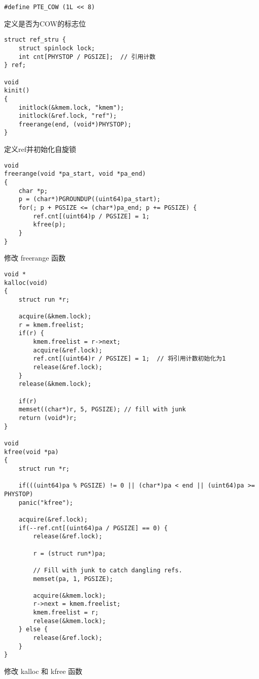 \begin{listing}[!htb]
	\begin{verbatim}
#define PTE_COW (1L << 8)
	\end{verbatim}
	\caption{定义是否为COW的标志位}\label{lst:define_PTE_COW}
\end{listing}

\begin{listing}[!htb]
	\begin{verbatim}
struct ref_stru {
    struct spinlock lock;
    int cnt[PHYSTOP / PGSIZE];  // 引用计数
} ref;

void
kinit()
{
    initlock(&kmem.lock, "kmem");
    initlock(&ref.lock, "ref");
    freerange(end, (void*)PHYSTOP);
}
	\end{verbatim}
	\caption{定义ref并初始化自旋锁}\label{lst:define_ref_and_init_self_lock}
\end{listing}

\begin{listing}[!htb]
	\begin{verbatim}
void
freerange(void *pa_start, void *pa_end)
{
    char *p;
    p = (char*)PGROUNDUP((uint64)pa_start);
    for(; p + PGSIZE <= (char*)pa_end; p += PGSIZE) {
        ref.cnt[(uint64)p / PGSIZE] = 1;
        kfree(p);
    }
}
	\end{verbatim}
	\caption{修改 freerange 函数}\label{lst:change_freerange}
\end{listing}

\begin{listing}[!htb]
	\begin{verbatim}
void *
kalloc(void)
{
    struct run *r;
    
    acquire(&kmem.lock);
    r = kmem.freelist;
    if(r) {
        kmem.freelist = r->next;
        acquire(&ref.lock);
        ref.cnt[(uint64)r / PGSIZE] = 1;  // 将引用计数初始化为1
        release(&ref.lock);
    }
    release(&kmem.lock);
    
    if(r)
    memset((char*)r, 5, PGSIZE); // fill with junk
    return (void*)r;
}

void
kfree(void *pa)
{
    struct run *r;
    
    if(((uint64)pa % PGSIZE) != 0 || (char*)pa < end || (uint64)pa >= PHYSTOP)
    panic("kfree");
    
    acquire(&ref.lock);
    if(--ref.cnt[(uint64)pa / PGSIZE] == 0) {
        release(&ref.lock);
    
        r = (struct run*)pa;
    
        // Fill with junk to catch dangling refs.
        memset(pa, 1, PGSIZE);
       
        acquire(&kmem.lock);
        r->next = kmem.freelist;
        kmem.freelist = r;
        release(&kmem.lock);
    } else {
        release(&ref.lock);
    }
}
	\end{verbatim}
	\caption{修改 kalloc 和 kfree 函数}\label{lst:change_kalloc_and_kfree}
\end{listing}


